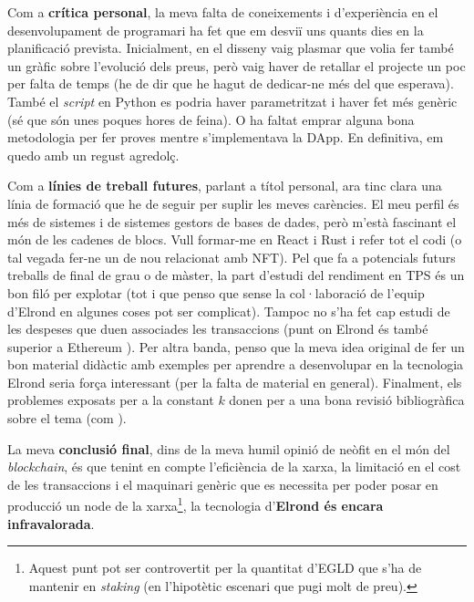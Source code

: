 \documentclass[11pt,a4paper]{article}
\begin{document}
Com a \textbf{crítica personal}, la meva falta de coneixements i d'experiència en el desenvolupament de programari ha fet que em desviï uns quants dies en la planificació prevista. Inicialment, en el disseny vaig plasmar que volia fer també un gràfic sobre l'evolució dels preus, però vaig haver de retallar el projecte un poc per falta de temps (he de dir que he hagut de dedicar-ne més del que esperava). També el \textit{script} en Python es podria haver parametritzat i haver fet més genèric (sé que són unes poques hores de feina). O ha faltat emprar alguna bona metodologia per fer proves mentre s'implementava la DApp. En definitiva, em quedo amb un regust agredolç.

Com a \textbf{línies de treball futures}, parlant a títol personal, ara tinc clara una línia de formació que he de seguir per suplir les meves carències. El meu perfil és més de sistemes i de sistemes gestors de bases de dades, però m'està fascinant el món de les cadenes de blocs. Vull formar-me en React i Rust i refer tot el codi (o tal vegada fer-ne un de nou relacionat amb NFT). Pel que fa a potencials futurs treballs de final de grau o de màster, la part d'estudi del rendiment en TPS és un bon filó per explotar (tot i que penso que sense la col·laboració de l'equip d'Elrond en algunes coses pot ser complicat). Tampoc no s'ha fet cap estudi de les despeses que duen associades les transaccions (punt on Elrond és també superior a Ethereum \cite{paradigm2019} \cite{everstake2020}). Per altra banda, penso que la meva idea original de fer un bon material didàctic amb exemples per aprendre a desenvolupar en la tecnologia Elrond seria força interessant (per la falta de material en general). Finalment, els problemes exposats per a la constant \(k\) donen per a una bona revisió bibliogràfica sobre el tema (com \cite{zhang2018}).

La meva \textbf{conclusió final}, dins de la meva humil opinió de neòfit en el món del \textit{blockchain}, és que tenint en compte l'eficiència de la xarxa, la limitació en el cost de les transaccions i el maquinari genèric que es necessita per poder posar en producció un node de la xarxa\footnote{Aquest punt pot ser controvertit per la quantitat d'EGLD que s'ha de mantenir en \textit{staking} (en l'hipotètic escenari que pugi molt de preu).}, la tecnologia d'\textbf{Elrond és encara infravalorada}.

\newpage 
\end{document}
